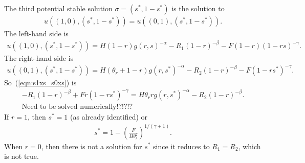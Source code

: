 \documentclass[10pt]{article}
\begin{document}
The third potential stable solution $\sigma = (s^*, 1-s^*)$ is the solution to
\begin{eqnarray}
\label{eqn:s1xs_s0xs}
u((1,0),(s^*,1-s^*)) = u((0,1),(s^*,1-s^*)).
\end{eqnarray}
The left-hand side is
\begin{eqnarray} \nonumber
u((1,0),(s^*,1-s^*)) =
H(1-r)g(r,s)^{-\alpha} - R_1(1-r)^{-\beta} - F(1-r)(1-rs)^{-\gamma}.
\end{eqnarray}
The right-hand side is
\begin{eqnarray} \nonumber
u((0,1),(s^*,1-s^*)) =
H(\theta_r + 1-r)g(r,s^*)^{-\alpha} - R_2(1-r)^{-\beta} - F(1-rs^*)^{-\gamma}.
\end{eqnarray}
So~(\ref{eqn:s1xs_s0xs}) is
\begin{eqnarray}
-R_1(1-r)^{-\beta} + Fr(1-rs^*)^{-\gamma} =
H\theta_r r g(r,s^*)^{-\alpha} - R_2(1-r)^{-\beta}.\\
\mbox{Need to be solved numerically!?!?!?}
\end{eqnarray}
If $r=1$, then $s^*=1$ (as already identified) or
\begin{eqnarray}
s^* = 1-\left(\frac{F}{H\theta_r^2}\right)^{1/(\gamma+1)}.
\end{eqnarray}
When $r=0$, then there is not a solution for $s^*$ since it reduces to $R_1=R_2$, which is not true.







\end{document}
